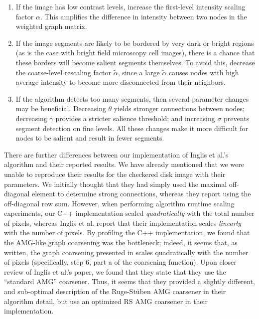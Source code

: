 \documentclass[12pt]{article}%
\begin{document}
\begin{enumerate}

\item If the image has low contrast levels, increase the first-level intensity scaling factor $\alpha$. This amplifies the difference in intensity between two nodes in the weighted graph matrix.

\item If the image segments are likely to be bordered by very dark or bright regions (as is the case with bright field microscopy cell images), there is a chance that these borders will become salient segments themselves. To avoid this, decrease the coarse-level rescaling factor $\tilde{\alpha}$, since a large $\tilde{\alpha}$ causes nodes with high average intensity to become more disconnected from their neighbors.

\item If the algorithm detects too many segments, then several parameter changes may be beneficial. Decreasing $\theta$ yields stronger connections between nodes; decreasing $\gamma$ provides a stricter salience threshold; and increasing $\sigma$ prevents segment detection on fine levels. All these changes make it more difficult for nodes to be salient and result in fewer segments.

\end{enumerate}

There are further differences between our implementation of Inglis et al.'s algorithm and their reported results.  We have already mentioned that we were unable to reproduce their results for the checkered disk image with their parameters.  We initially thought that they had simply used the maximal off-diagonal element to determine strong connections, whereas they report using the off-diagonal row sum.  However, when performing algorithm runtime scaling experiments, our C++ implementation scaled \emph{quadratically} with the total number of pixels, whereas Inglis et al. report that their implementation scales \emph{linearly} with the number of pixels.  By profiling the C++ implementation, we found that the AMG-like graph coarsening was the bottleneck; indeed, it seems that, as written, the graph coarsening presented in \cite{inglis:2010} scales quadratically with the number of pixels (specifically, step 6, part a of the coarsening function).  Upon closer review of Inglis et al.'s paper, we found that they state that they use the ``standard AMG'' coarsener.  Thus, it seems that they provided a slightly different, and sub-optimal description of the Ruge-St\"uben AMG coarsener in their algorithm detail, but use an optimized RS AMG coarsener in their implementation.\\
\end{document}
